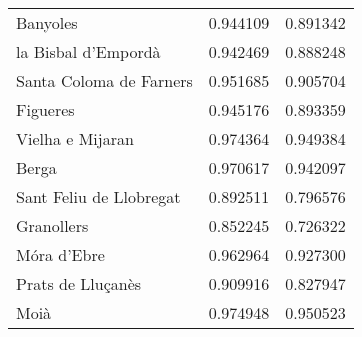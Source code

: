 \begin{tabular}{lrr}
Banyoles & 0.944109 & 0.891342 \\
la Bisbal d'Empordà & 0.942469 & 0.888248 \\
Santa Coloma de Farners & 0.951685 & 0.905704 \\
Figueres & 0.945176 & 0.893359 \\
Vielha e Mijaran & 0.974364 & 0.949384 \\
Berga & 0.970617 & 0.942097 \\
Sant Feliu de Llobregat & 0.892511 & 0.796576 \\
Granollers & 0.852245 & 0.726322 \\
Móra d'Ebre & 0.962964 & 0.927300 \\
Prats de Lluçanès & 0.909916 & 0.827947 \\
Moià & 0.974948 & 0.950523 \\
\bottomrule
\end{tabular}
